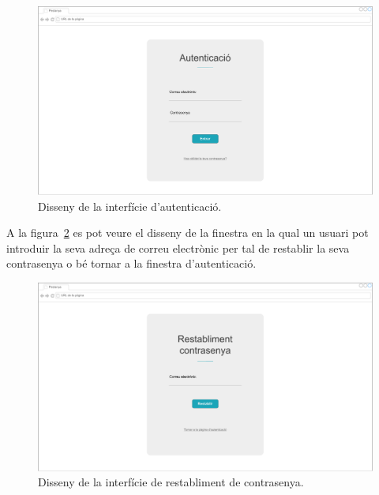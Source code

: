 \documentclass[a4paper,12pt]{ThesisStyle}
\begin{document}
\newpage

\begin{figure}[H]
	\centering
	\includegraphics[width=\textwidth]{assets/interfaces/auth/login.pdf}
	\caption{\label{img:login}Disseny de la interfície d'autenticació.}
\end{figure}

A la figura~\ref{img:passwordRestablishment} es pot veure el disseny de la finestra en la qual un usuari pot introduir la seva adreça de correu electrònic per tal de restablir la seva contrasenya o bé tornar a la finestra d'autenticació.
\begin{figure}[H]
	\centering
	\includegraphics[width=\textwidth]{assets/interfaces/auth/passwordRestablishment.pdf}
	\caption{\label{img:passwordRestablishment}Disseny de la interfície de restabliment de contrasenya.}
\end{figure}

\newpage
\end{document}
